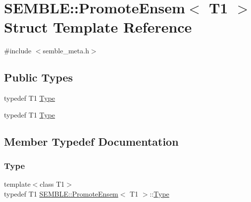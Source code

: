 \hypertarget{structSEMBLE_1_1PromoteEnsem}{}\section{S\+E\+M\+B\+LE\+:\+:Promote\+Ensem$<$ T1 $>$ Struct Template Reference}
\label{structSEMBLE_1_1PromoteEnsem}


{\ttfamily \#include $<$semble\+\_\+meta.\+h$>$}

\subsection*{Public Types}
\begin{DoxyCompactItemize}
\item 
typedef T1 \mbox{\hyperlink{structSEMBLE_1_1PromoteEnsem_a14f38c8aa1755d1201dd126a233e32a8}{Type}}
\item 
typedef T1 \mbox{\hyperlink{structSEMBLE_1_1PromoteEnsem_a14f38c8aa1755d1201dd126a233e32a8}{Type}}
\end{DoxyCompactItemize}


\subsection{Member Typedef Documentation}
\mbox{\label{structSEMBLE_1_1PromoteEnsem_a14f38c8aa1755d1201dd126a233e32a8}} 
\subsubsection{\texorpdfstring{Type}{Type}\hspace{0.1cm}{\footnotesize\ttfamily [1/2]}}
{\footnotesize\ttfamily template$<$class T1$>$ \\
typedef T1 \mbox{\hyperlink{structSEMBLE_1_1PromoteEnsem}{S\+E\+M\+B\+L\+E\+::\+Promote\+Ensem}}$<$ T1 $>$\+::\mbox{\hyperlink{structSEMBLE_1_1PromoteEnsem_a14f38c8aa1755d1201dd126a233e32a8}{Type}}}

\mbox{\label{structSEMBLE_1_1PromoteEnsem_a14f38c8aa1755d1201dd126a233e32a8}} 
